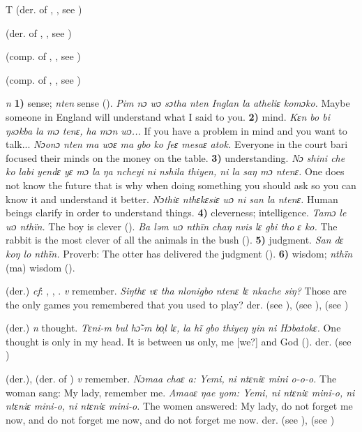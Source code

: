 \begin{letter}{T}
 (der. of , , see ) 

 (der. of , , see ) 

 (comp. of , , see ) 

 (comp. of , , see ) 

 \textit{n} \textbf{1)} sense; \textit{nten} sense (\citealt{Sumner1921}). \textit{Pim nɔ wɔ sɔtha nten Inglan la atheliɛ komɔko.} Maybe someone in England will understand what I said to you. \textbf{2)} mind. \textit{Kɛn bo bi ŋsɔkba la mɔ tenɛ, ha mɔn wɔ...} If you have a problem in mind and you want to talk... \textit{Nɔonɔ nten ma wɔɛ ma gbo ko feɛ mesaɛ atok.} Everyone in the court bari focused their minds on the money on the table. \textbf{3)} understanding. \textit{Nɔ shini che ko labi yendɛ yɛ mɔ la ŋa ncheyi ni nshila thiyen, ni la saŋ mɔ ntenɛ.} One does not know the future that is why when doing something you should ask so you can know it and understand it better. \textit{Nɔthiɛ nthɛkɛsiɛ wɔ ni san la ntenɛ.} Human beings clarify in order to understand things. \textbf{4)} cleverness; intelligence. \textit{Tamɔ le wɔ nthïn.} The boy is clever (\citealt{Pichl1967}). \textit{Ba ləm wɔ nthïn chaŋ nvis lɛ gbi tho ɛ ko.} The rabbit is the most clever of all the animals in the bush (\citealt{Pichl1967}). \textbf{5)} judgment. \textit{San dɛ koŋ lo nthïn.} Proverb: The otter has delivered the judgment (\citealt{Pichl1967}). \textbf{6)} wisdom; \textit{nthïn} (ma) wisdom (\citealt{Pichl1967}). 

 (der.) \textit{cf}: , , . \textit{v} remember. \textit{Siŋthɛ vɛ tha nlonigbo ntenɛ lɛ nkache siŋ?} Those are the only games you remembered that you used to play? der.  (see ),  (see ),  (see )

 (der.) \textit{n} thought. \textit{Tɛni-m bul hɔ̃-m bo̹l lɛ, la hĩ gbo thiyeŋ yin ni Hɔbatokɛ.} One thought is only in my head. It is between us only, me [we?] and God (\citealt{Pichl1967}). der.  (see )

 (der.), (der. of ) \textit{v} remember. \textit{Nɔmaa chaɛ a: Yemi, ni ntɛniɛ mini o-o-o.} The woman sang: My lady, remember me. \textit{Amaaɛ ŋae yom: Yemi, ni ntɛniɛ mini-o, ni ntɛniɛ mini-o, ni ntɛniɛ mini-o.} The women answered: My lady, do not forget me now, and do not forget me now, and do not forget me now. der.  (see ),  (see )


\end{letter}
